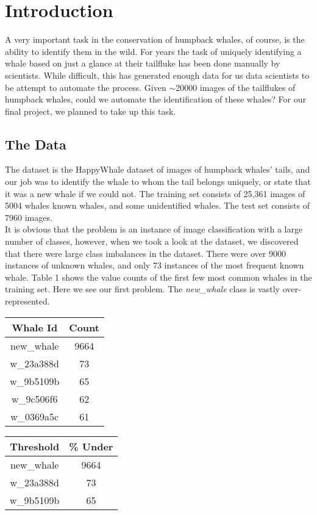 \section{Introduction}
A very important task in the conservation of humpback whales, of course, is the ability to identify them in the wild. For years the task of uniquely identifying a whale based on just a glance at their tailfluke has been done manually by scientists. While difficult, this has generated enough data for us data scientists to be attempt to automate the process. Given $\sim$20000 images of the tailflukes of humpback whales, could we automate the identification of these whales? For our final project, we planned to take up this task. 

\subsection{The Data}

The dataset is the HappyWhale dataset of images of humpback whales' tails, and our job was to identify the whale to whom the tail belongs uniquely, or state that it was a new whale if we could not. The training set consists of 25,361 images of 5004 whales known whales, and some unidentified whales. The test set consists of 7960 images. \\

It is obvious that the problem is an instance of image classification with a large number of classes, however, when we took a look at the dataset, we discovered that there were large class imbalances in the dataset. There were over 9000 instances of unknown whales, and only 73 instances of the most frequent known whale. Table 1 shows the value counts of the first few most common whales in the training set. Here we see our first problem. The \textit{new\_whale} class is vastly over-represented.

\begin{table}[ht]
\centering
\begin{tabular}{|c|c|}\hline
\textbf{Whale Id} & \textbf{Count}\\ \hline
new\_whale  & 9664\\ \hline
w\_23a388d  & 73\\ \hline
w\_9b5109b  & 65\\ \hline
w\_9c506f6  & 62\\ \hline
w\_0369a5c  & 61\\ \hline
\end{tabular}
\qquad\qquad
\begin{tabular}{|c|c|}\hline
\textbf{Threshold} & \textbf{\%  Under}\\ \hline
new\_whale  & 9664\\ \hline
w\_23a388d  & 73\\ \hline
w\_9b5109b  & 65\\ \hline

\end{tabular}
\end{table}